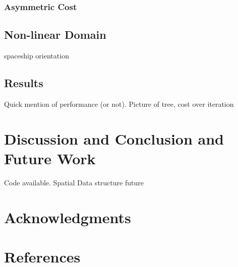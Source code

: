 \documentclass[letterpaper, 10pt, english, conference]{IEEEtran}
\begin{document}
\subsubsection{Asymmetric Cost}

\subsection{Non-linear Domain}

spaceship orientation


\subsection{Results}

Quick mention of performance (or not). Picture of tree, cost over
iteration


\section{Discussion and Conclusion and Future Work}

Code available. Spatial Data structure future


\section{Acknowledgments}


\section{References}


\end{document}
